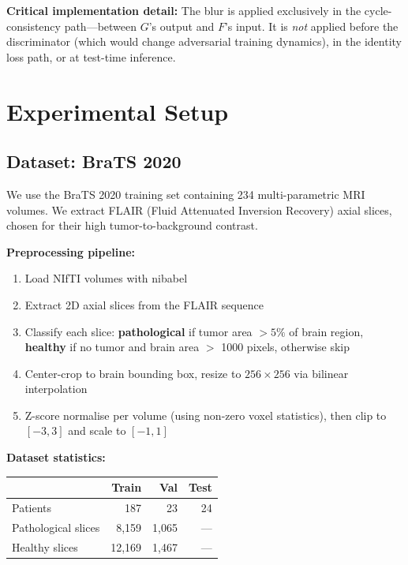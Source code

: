 \documentclass[11pt,a4paper]{article}
\theoremstyle{definition}
\begin{document}
\textbf{Critical implementation detail:} The blur is applied exclusively in the cycle-consistency path---between $G$'s output and $F$'s input. It is \emph{not} applied before the discriminator (which would change adversarial training dynamics), in the identity loss path, or at test-time inference.

\section{Experimental Setup}

\subsection{Dataset: BraTS 2020}

We use the BraTS 2020 training set containing 234 multi-parametric MRI volumes. We extract FLAIR (Fluid Attenuated Inversion Recovery) axial slices, chosen for their high tumor-to-background contrast.

\textbf{Preprocessing pipeline:}
\begin{enumerate}
    \item Load NIfTI volumes with nibabel
    \item Extract 2D axial slices from the FLAIR sequence
    \item Classify each slice: \textbf{pathological} if tumor area $> 5\%$ of brain region, \textbf{healthy} if no tumor and brain area $>$ 1000 pixels, otherwise skip
    \item Center-crop to brain bounding box, resize to $256 \times 256$ via bilinear interpolation
    \item Z-score normalise per volume (using non-zero voxel statistics), then clip to $[-3, 3]$ and scale to $[-1, 1]$
\end{enumerate}

\textbf{Dataset statistics:}
\begin{center}
\begin{tabular}{lrrr}
\toprule
& Train & Val & Test \\
\midrule
Patients & 187 & 23 & 24 \\
Pathological slices & 8,159 & 1,065 & --- \\
Healthy slices & 12,169 & 1,467 & --- \\
\bottomrule
\end{tabular}
\end{center}
\end{document}

